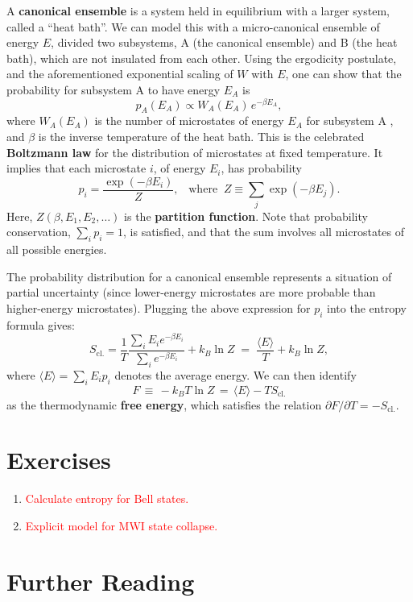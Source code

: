 \documentclass[pra,11pt]{revtex4}
\begin{document}
A \textbf{canonical ensemble} is a system held in equilibrium with a
larger system, called a ``heat bath''.  We can model this with a
micro-canonical ensemble of energy $E$, divided two subsystems, A (the
canonical ensemble) and B (the heat bath), which are not insulated
from each other.  Using the ergodicity postulate, and the
aforementioned exponential scaling of $W$ with $E$, one can show that
the probability for subsystem A to have energy $E_A$ is
$$p_A(E_A) \propto W_A(E_A) \, e^{-\beta E_A},$$
where $W_A(E_A)$ is the number of microstates of energy $E_A$ for
subsystem A , and $\beta$ is the inverse temperature of the heat bath.
This is the celebrated \textbf{Boltzmann law} for the distribution of
microstates at fixed temperature.  It implies that each microstate
$i$, of energy $E_i$, has probability
$$p_i = \frac{\exp(-\beta E_i)}{Z}, \;\;\;\mathrm{where}\;\;Z \equiv \sum_j \exp(-\beta E_j).$$
Here, $Z(\beta,E_1, E_2,\dots)$ is the \textbf{partition function}.
Note that probability conservation, $\sum_i p_i = 1$, is satisfied,
and that the sum involves all microstates of all possible energies.

The probability distribution for a canonical ensemble represents a
situation of partial uncertainty (since lower-energy microstates are
more probable than higher-energy microstates).  Plugging the above
expression for $p_i$ into the entropy formula gives:
$$S_{\mathrm{cl.}} = \frac{1}{T} \frac{\sum_i E_i e^{-\beta E_i}}{\sum_i e^{-\beta E_i}} + k_B \ln Z \;=\; \frac{\langle E\rangle}{T} + k_B \ln Z,$$
where $\langle E\rangle = \sum_i E_i p_i$ denotes the average energy.
We can then identify
$$F \,\equiv\, - k_B T \ln Z \,=\, \langle E \rangle - TS_{\mathrm{cl.}}$$
as the thermodynamic \textbf{free energy}, which satisfies the
relation $\partial F/\partial T = - S_{\mathrm{cl.}}$.



\section*{Exercises}

\begin{enumerate}
\item \textcolor{red}{Calculate entropy for Bell states.}
\item \textcolor{red}{Explicit model for MWI state collapse.}
\end{enumerate}

\section*{Further Reading}
\end{document}
